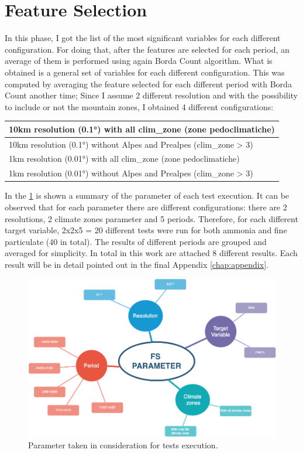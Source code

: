 \section{Feature Selection}
In this phase, I got the list of the most significant variables for each different configuration.
For doing that, after the features are selected for each period, an average of them is performed using again Borda Count algorithm. What is obtained is a general set of variables for each different configuration.
This was computed by averaging the feature selected for each different period with Borda Count another time;
Since I assume 2 different resolution and with the possibility to include or not the mountain zones, I obtained 4 different configurations: 
\begin{table}[H]
    \centering
    \begin{tabular}{|l|}
    \hline
        10km resolution (0.1°) with all clim\_zone (zone pedoclimatiche)  \\ \hline
        10km resolution (0.1°) without Alpes and Prealpes (clim\_zone > 3) \\ \hline
        1km resolution (0.01°) with all clim\_zone (zone pedoclimatiche)   \\ \hline
        1km resolution (0.01°) without Alpes and Prealpes (clim\_zone > 3)  \\ \hline
 
    \end{tabular}
\end{table}
In the \ref{fig:test_params} is shown a summary of the parameter of each test execution.
It can be observed that for each parameter there are different configurations: there are 2 resolutions, 2 climate zones parameter and 5 periods. Therefore, for each different target variable, 2x2x5 = 20 different tests were run for both ammonia and fine particulate (40 in total). 
The results of different periods are grouped and averaged for simplicity. In total in this work are attached 8 different results. Each result will be in detail pointed out in the final Appendix \ref{chap:appendix}.
\begin{figure}[H]
    \centering
    \includegraphics[width=.9\textwidth]{images/test_param.png}
    \caption{Parameter taken in consideration for tests execution.}
    \label{fig:test_params}
\end{figure}


